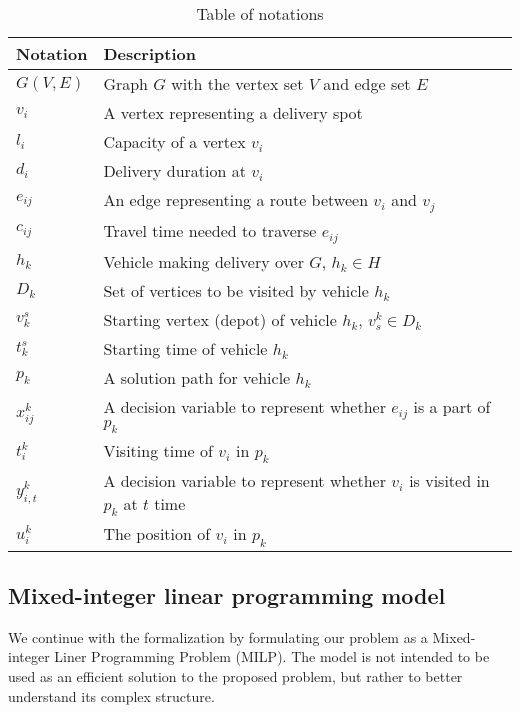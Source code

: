 \documentclass[conference]{IEEEtran}
\begin{document}
\begin{table}[b]
{\caption{Table of notations}}
\begin{tabular}{|p{1.5cm}|p{6cm}|}
\hline
\textbf{Notation} & \textbf{Description}\\
\hline
$ G(V,E) $ & Graph $G$ with the vertex set $V$ and edge set $E$ \\
\hline
$ v_i $ & A vertex representing a delivery spot \\
\hline
$ l_i $ & Capacity of a vertex $v_i$ \\
\hline
$ d_i $ & Delivery duration at $v_i$ \\
\hline
$ e_{ij} $ & An edge representing a route between $v_i$ and $v_j$\\
\hline
$ c_{ij} $ & Travel time needed to traverse $e_{ij}$ \\
\hline
$ h_k $ & Vehicle making delivery over $G$, $h_k \in H$  \\
\hline
$ D_k $ & Set of vertices to be visited by vehicle $h_k$ \\
\hline
$ v_k^s $ & Starting vertex (depot) of vehicle $h_k$, $v_s^k\in D_k$  \\
\hline
$ t_k^s $ &  Starting time of vehicle $h_k$ \\
\hline
$ p_k $ &  A solution path for vehicle $h_k$\\
\hline
$ x_{ij}^k $ & A decision variable to represent whether $e_{ij}$ is a part of $p_k$ \\
\hline
$ t_{i}^k $ & Visiting time of $v_i$ in $p_k$ \\
\hline
$ y_{i,t}^k $ & A decision variable to represent whether $v_i$ is visited in $p_k$ at $t$ time \\
\hline
$ u_{i}^k $ & The position of $v_i$ in $p_k$ \\
\hline
\end{tabular}
\end{table}

\subsection{Mixed-integer linear programming model}
\label{subsec:milp}

We continue with the formalization by formulating our problem as a Mixed-integer Liner Programming Problem (MILP). The model is not intended to be used as an efficient solution to the proposed problem, but rather to better understand its complex structure.
\end{document}
